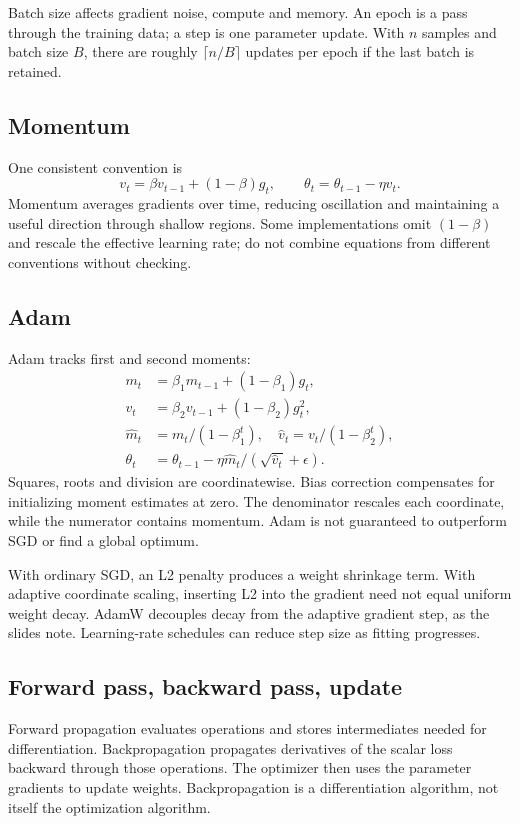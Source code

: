 \documentclass[11pt]{article}
\begin{document}
Batch size affects gradient noise, compute and memory. An epoch is a pass through the training data; a step is one parameter update. With $n$ samples and batch size $B$, there are roughly $\lceil n/B\rceil$ updates per epoch if the last batch is retained.
\subsection{Momentum}
One consistent convention is
\[
v_t=\beta v_{t-1}+(1-\beta)g_t,\qquad
\theta_t=\theta_{t-1}-\eta v_t.
\]
Momentum averages gradients over time, reducing oscillation and maintaining a useful direction through shallow regions. Some implementations omit $(1-\beta)$ and rescale the effective learning rate; do not combine equations from different conventions without checking.
\subsection{Adam}
Adam tracks first and second moments:
\begin{align*}
m_t&=\beta_1m_{t-1}+(1-\beta_1)g_t,\\
v_t&=\beta_2v_{t-1}+(1-\beta_2)g_t^2,\\
\hat m_t&=m_t/(1-\beta_1^t),\quad
\hat v_t=v_t/(1-\beta_2^t),\\
\theta_t&=\theta_{t-1}-\eta\hat m_t/(\sqrt{\hat v_t}+\epsilon).
\end{align*}
Squares, roots and division are coordinatewise. Bias correction compensates for initializing moment estimates at zero. The denominator rescales each coordinate, while the numerator contains momentum. Adam is not guaranteed to outperform SGD or find a global optimum.

With ordinary SGD, an L2 penalty produces a weight shrinkage term. With adaptive coordinate scaling, inserting L2 into the gradient need not equal uniform weight decay. AdamW decouples decay from the adaptive gradient step, as the slides note. Learning-rate schedules can reduce step size as fitting progresses.
\subsection{Forward pass, backward pass, update}
Forward propagation evaluates operations and stores intermediates needed for differentiation. Backpropagation propagates derivatives of the scalar loss backward through those operations. The optimizer then uses the parameter gradients to update weights. Backpropagation is a differentiation algorithm, not itself the optimization algorithm.
\end{document}
